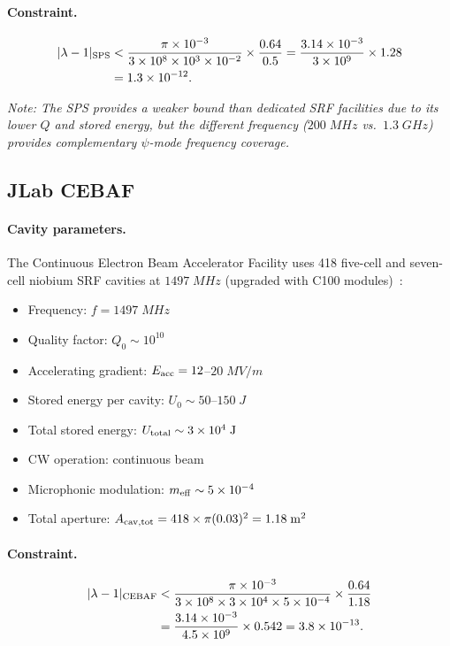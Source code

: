 \documentclass[aps,prd,twocolumn,superscriptaddress,floatfix,nofootinbib]{revtex4-2}
\newcommand{\lam}{\lambda}
\begin{document}
\paragraph{Constraint.}
\begin{align}
|\lam-1|_{\rm SPS} &< \frac{\pi \times 10^{-3}}
{3\times10^8 \times 10^3 \times 10^{-2}}
\times \frac{0.64}{0.5} = \frac{3.14\times10^{-3}}{3\times10^9}
\times 1.28 \notag\\
&= 1.3\times10^{-12}.
\end{align}

\emph{Note: The SPS provides a weaker bound than dedicated SRF facilities
due to its lower $Q$ and stored energy, but the different frequency
($200\;\si{MHz}$ vs.\ $1.3\;\si{GHz}$) provides complementary
$\psi$-mode frequency coverage.}

\subsection{JLab CEBAF}\label{sec:jlab}

\paragraph{Cavity parameters.}
The Continuous Electron Beam Accelerator Facility uses
418 five-cell and seven-cell niobium SRF cavities at $1497\;\si{MHz}$
(upgraded with C100 modules)~\cite{Leemann2001}:
\begin{itemize}[nosep]
\item Frequency: $f = 1497\;\si{MHz}$
\item Quality factor: $Q_0 \sim 10^{10}$
\item Accelerating gradient: $E_{\rm acc} = 12$--$20\;\si{MV/m}$
\item Stored energy per cavity: $U_0 \sim 50$--$150\;\si{J}$
\item Total stored energy: $U_{\rm total} \sim 3\times10^4\;\si{J}$
\item CW operation: continuous beam
\item Microphonic modulation: $m_{\rm eff} \sim 5\times10^{-4}$
\item Total aperture: $A_{\rm cav,tot} = 418 \times \pi(0.03)^2
= 1.18\;\si{m^2}$
\end{itemize}

\paragraph{Constraint.}
\begin{align}
|\lam-1|_{\rm CEBAF} &< \frac{\pi \times 10^{-3}}
{3\times10^8 \times 3\times10^4 \times 5\times10^{-4}}
\times \frac{0.64}{1.18} \notag\\
&= \frac{3.14\times10^{-3}}{4.5\times10^9} \times 0.542
= 3.8\times10^{-13}.
\end{align}
\end{document}

